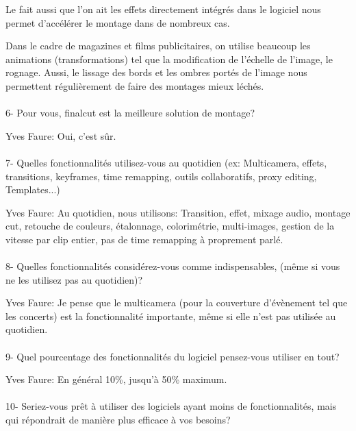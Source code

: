 Le fait aussi que l'on ait les effets directement intégrés dans le logiciel nous
permet d'accélérer le montage dans de nombreux cas.

Dans le cadre de magazines et films publicitaires, on utilise beaucoup les
animations (transformations) tel que la modification de l'échelle de l'image,
le rognage. Aussi, le lissage des bords et les ombres portés de l'image nous
permettent régulièrement de faire des montages mieux léchés.


\paragraph{}
6- Pour vous, finalcut est la meilleure solution de montage?

Yves Faure: Oui, c'est sûr.

\paragraph{}
7-  Quelles fonctionnalités utilisez-vous au quotidien (ex: Multicamera, effets,
transitions, keyframes, time remapping, outils collaboratifs, proxy
editing, Templates...)

Yves Faure: Au quotidien, nous utilisons: Transition, effet, mixage audio, montage cut,
retouche de couleurs, étalonnage, colorimétrie, multi-images, gestion de la
vitesse par clip entier, pas de time remapping à proprement parlé.

\paragraph{}
8-  Quelles fonctionnalités considérez-vous comme indispensables, (même si vous
ne les utilisez pas au quotidien)?

Yves Faure: Je pense que le multicamera (pour la couverture d'évènement tel que les
concerts) est la fonctionnalité importante, même si elle n'est pas utilisée au quotidien.

\paragraph{}
9- Quel pourcentage des fonctionnalités du logiciel pensez-vous utiliser
en tout?

Yves Faure: En général 10\%, jusqu'à 50\% maximum.

\paragraph{}
10- Seriez-vous prêt à utiliser des logiciels ayant moins de
fonctionnalités, mais qui répondrait de manière plus efficace
à vos besoins?

